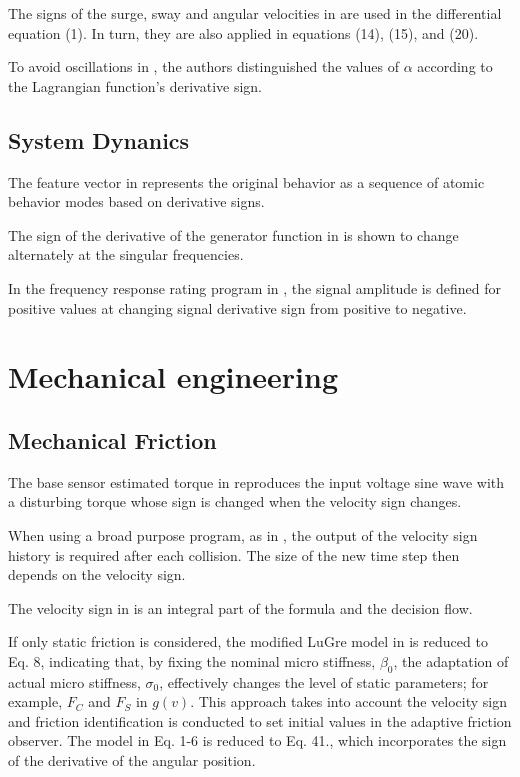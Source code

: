 \documentclass[11pt]{book}
\begin{document}
The signs of the surge, sway and angular velocities in \cite{karami2019adaptive}
are used in the differential equation (1). In turn, they are also
applied in equations (14), (15), and (20).

To avoid oscillations in \cite{nikolaidis2020enhanced}, the authors
distinguished the values of $\alpha$ according to the Lagrangian
function's derivative sign.


\subsection{System Dynanics}

The feature vector in \cite{onsel2013evaluation} represents the original
behavior as a sequence of atomic behavior modes based on derivative
signs.

The sign of the derivative of the generator function in \cite{almodaresi2016stability}
is shown to change alternately at the singular frequencies.

In the frequency response rating program in \cite{shokhin2017use},
the signal amplitude is defined for positive values at changing signal
derivative sign from positive to negative.


\section{Mechanical engineering}


\subsection{Mechanical Friction}

The base sensor estimated torque in \cite{morel1996precise} reproduces
the input voltage sine wave with a disturbing torque whose sign is
changed when the velocity sign changes.

When using a broad purpose program, as in \cite{dimova2000numerical},
the output of the velocity sign history is required after each collision.
The size of the new time step then depends on the velocity sign.

The velocity sign in \cite{ryu2001nonlinear} is an integral part
of the formula and the decision flow.

If only static friction is considered, the modified LuGre model in
\cite{chen2014dual} is reduced to Eq. 8, indicating that, by fixing
the nominal micro stiffness, $\beta_{0}$, the adaptation of actual
micro stiffness, $\sigma_{0}$, effectively changes the level of static
parameters; for example, $F_{C}$ and $F_{S}$ in $g\left(v\right)$.
This approach takes into account the velocity sign and friction identification
is conducted to set initial values in the adaptive friction observer.
The model in Eq. 1-6 is reduced to Eq. 41., which incorporates the
sign of the derivative of the angular position.
\end{document}
